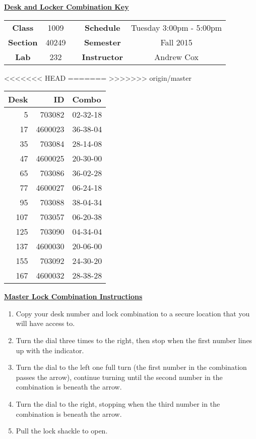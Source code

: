 \documentclass[12pt]{article}
\begin{document}
\thispagestyle{empty}

\begin{center}
	{\huge\textbf{\underline{ Desk and Locker Combination Key}}}
\end{center}


\begin{table}[h]
  \centering
  \begin{tabular}{ccccc}

  \textbf{Class} & 1009 & {\qquad} &\textbf{Schedule} & Tuesday 3:00pm - 5:00pm \\
  \textbf{Section} & 40249 & {\qquad} & \textbf{Semester} & Fall 2015 \\
  \textbf{Lab} & 232 & {\qquad} & \textbf{Instructor} & Andrew Cox \\
  \end{tabular}
\end{table}
<<<<<<< HEAD
 \vspace{0.1in}
=======
 \vspace{0.5in}
>>>>>>> origin/master
\begin{minipage}{0.4\textwidth}

\begin{tabular}{rrl}
\toprule
 Desk &       ID &     Combo \\
\midrule
    5 &   703082 &  02-32-18 \\
   17 &  4600023 &  36-38-04 \\
   35 &   703084 &  28-14-08 \\
   47 &  4600025 &  20-30-00 \\
   65 &   703086 &  36-02-28 \\
   77 &  4600027 &  06-24-18 \\
   95 &   703088 &  38-04-34 \\
  107 &   703057 &  06-20-38 \\
  125 &   703090 &  04-34-04 \\
  137 &  4600030 &  20-06-00 \\
  155 &   703092 &  24-30-20 \\
  167 &  4600032 &  28-38-28 \\
\bottomrule
\end{tabular}


\end{minipage}
\begin{minipage}{0.4\textwidth}
\underline{{\large \textbf{Master Lock Combination Instructions}}}
\begin{enumerate}
\item Copy your desk number and lock combination to a secure location that you will have access to.
\item Turn the dial three times to the right, then stop when the first number lines up with the indicator.
\item Turn the dial to the left one full turn (the first number in the combination passes the arrow), continue turning until the second number in the combination is beneath the arrow.
\item Turn the dial to the right, stopping when the third number in the combination is beneath the arrow.
\item Pull the lock shackle to open.
\end{enumerate}
\end{minipage}
\end{document}
